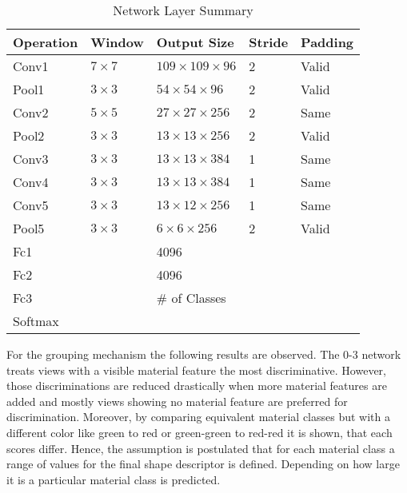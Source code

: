\begin{table}[]
\centering
\caption{Network Layer Summary}
\label{tab:network-layers}
	\begin{tabular}{lllll}
		Operation & Window       & Output Size                & Stride & Padding \\ \hline
		Conv1     & $7 \times 7$ & $109 \times 109 \times 96$ & 2      & Valid   \\
		Pool1     & $3 \times 3$ & $54 \times 54 \times 96$   & 2      & Valid   \\ \hline
		Conv2     & $5 \times 5$ & $27 \times 27 \times 256$  & 2      & Same    \\
		Pool2     & $3 \times 3$ & $13 \times 13 \times 256$  & 2      & Valid   \\ \hline
		Conv3     & $3 \times 3$ & $13 \times 13 \times 384$  & 1      & Same    \\ \hline
		Conv4     & $3 \times 3$ & $13 \times 13 \times 384$  & 1      & Same    \\ \hline
		Conv5     & $3 \times 3$ & $13 \times 12 \times 256$  & 1      & Same    \\
		Pool5     & $3 \times 3$ & $6 \times 6 \times 256$    & 2      & Valid   \\ \hline
		Fc1       &              & 4096                       &        &         \\ \hline
		Fc2       &              & 4096                       &        &         \\ \hline
		Fc3       &              & \# of Classes              &        &         \\ \hline
		Softmax   &              &                            &        &         \\ \hline
	\end{tabular}
\end{table}

For the grouping mechanism the following results are observed.
The 0-3 network treats views with a visible material feature the most discriminative.
However, those discriminations are reduced drastically when more material features are added and mostly views showing no material feature are preferred for discrimination.
Moreover, by comparing equivalent material classes but with a different color like green to red or green-green to red-red it is shown, that each scores differ.
Hence, the assumption is postulated that for each material class a range of values for the final shape descriptor is defined.
Depending on how large it is a particular material class is predicted.

